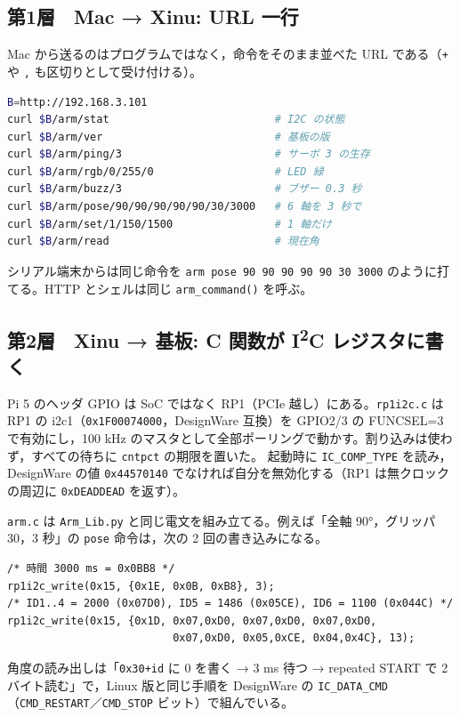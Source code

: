 \documentclass[a4paper,11pt]{article}
\begin{document}
\subsection*{第1層　Mac → Xinu: URL 一行}
Mac から送るのはプログラムではなく，命令をそのまま並べた URL である（\texttt{+} や \texttt{,} も区切りとして受け付ける）。
\begin{lstlisting}[language=bash,basicstyle=\ttfamily\footnotesize]
B=http://192.168.3.101
curl $B/arm/stat                          # I2C の状態
curl $B/arm/ver                           # 基板の版
curl $B/arm/ping/3                        # サーボ 3 の生存
curl $B/arm/rgb/0/255/0                   # LED 緑
curl $B/arm/buzz/3                        # ブザー 0.3 秒
curl $B/arm/pose/90/90/90/90/90/30/3000   # 6 軸を 3 秒で
curl $B/arm/set/1/150/1500                # 1 軸だけ
curl $B/arm/read                          # 現在角
\end{lstlisting}
シリアル端末からは同じ命令を \texttt{arm pose 90 90 90 90 90 30 3000} のように打てる。HTTP とシェルは同じ \texttt{arm\_command()} を呼ぶ。

\subsection*{第2層　Xinu → 基板: C 関数が I\textsuperscript{2}C レジスタに書く}
{\sloppy Pi 5 のヘッダ GPIO は SoC ではなく RP1（PCIe 越し）にある。\texttt{rp1i2c.c} は RP1 の i2c1（\texttt{0x1F00074000}，DesignWare 互換）を
GPIO2/3 の FUNCSEL=3 で有効にし，100 kHz のマスタとして全部ポーリングで動かす。割り込みは使わず，すべての待ちに \texttt{cntpct} の期限を置いた。
起動時に \texttt{IC\_COMP\_TYPE} を読み，DesignWare の値 \texttt{0x44570140} でなければ自分を無効化する（RP1 は無クロックの周辺に \texttt{0xDEADDEAD} を返す）。

\texttt{arm.c} は \texttt{Arm\_Lib.py} と同じ電文を組み立てる。例えば「全軸 90°，グリッパ 30，3 秒」の \texttt{pose} 命令は，次の 2 回の書き込みになる。
\begin{lstlisting}[basicstyle=\ttfamily\footnotesize]
/* 時間 3000 ms = 0x0BB8 */
rp1i2c_write(0x15, {0x1E, 0x0B, 0xB8}, 3);
/* ID1..4 = 2000 (0x07D0), ID5 = 1486 (0x05CE), ID6 = 1100 (0x044C) */
rp1i2c_write(0x15, {0x1D, 0x07,0xD0, 0x07,0xD0, 0x07,0xD0,
                          0x07,0xD0, 0x05,0xCE, 0x04,0x4C}, 13);
\end{lstlisting}
角度の読み出しは「\texttt{0x30+id} に 0 を書く → 3 ms 待つ → repeated START で 2 バイト読む」で，Linux 版と同じ手順を DesignWare の
\texttt{IC\_DATA\_CMD}（\texttt{CMD\_RESTART}／\texttt{CMD\_STOP} ビット）で組んでいる。\par}
\end{document}
